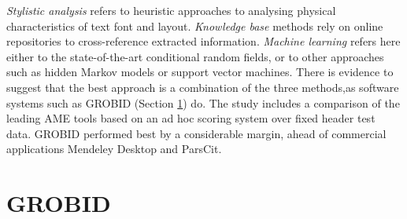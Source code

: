 \emph{Stylistic analysis} refers to heuristic approaches to analysing physical characteristics of text font and layout. \emph{Knowledge base} methods rely on online repositories to cross-reference extracted information. \emph{Machine learning} refers here either to the state-of-the-art conditional random fields, or to other approaches such as hidden Markov models or support vector machines. There is evidence to suggest that the best approach is a combination of the three methods,as software systems such as GROBID (Section \ref{sec:grobid}) do. The study includes a comparison of the leading AME tools based on an ad hoc scoring system over fixed header test data. GROBID performed best by a considerable margin, ahead of commercial applications Mendeley Desktop and ParsCit.

\section{GROBID}
\label{sec:grobid}
